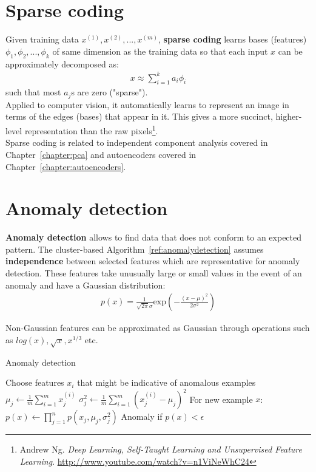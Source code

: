 \documentclass{report}
\begin{document}
\section{Sparse coding}
\label{chapter:sparsecoding}
Given training data $x^{(1)},x^{(2)},...,x^{(m)}$, {\bf sparse coding} learns bases (features) $\phi_1, \phi_2, ..., \phi_k$ of same dimension as the training data so that each input $x$ can be approximately decomposed as:
\begin{align*}
x \approx \sum_{i=1}^k a_i \phi_i
\end{align*}
such that most $a_j$s are zero ("sparse"). \\
Applied to computer vision, it automatically learns to represent an image in terms of the edges (bases) that appear in it.
This gives a more succinct, higher-level representation than the raw pixels\footnote{Andrew Ng. {\em Deep Learning, Self-Taught Learning and Unsupervised Feature Learning}. \url{http://www.youtube.com/watch?v=n1ViNeWhC24}}.
\\
Sparse coding is related to independent component analysis covered in Chapter~\ref{chapter:pca} and autoencoders covered in Chapter~\ref{chapter:autoencoders}.


\section{Anomaly detection}
{\bf Anomaly detection} allows to find data that does not conform to an expected pattern. The cluster-based Algorithm~\ref{ref:anomalydetection} assumes {\bf independence} between selected features which are representative for anomaly detection. These features take unusually large or small values in the event of an anomaly and have a Gaussian distribution:
\begin{align*}
p(x)=\frac{1}{\sqrt{2\pi}\sigma}\mbox{exp}(-\frac{(x-\mu)^2}{2\sigma^2})
\end{align*}

Non-Gaussian features can be approximated as Gaussian through operations such as $log(x), \sqrt{x}, x^{1/3}$ etc.

\begin{algorithm}
\caption{Anomaly detection}
\label{ref:anomalydetection}
\begin{algorithmic}
\State Choose features $x_i$ that might be indicative of anomalous examples
\State $\mu_j \gets \frac{1}{m}\sum_{i=1}^{m}x_j^{(i)}$ 
\State $\sigma_j^2 \gets \frac{1}{m}\sum_{i=1}^{m}(x_j^{(i)}-\mu_j)^2$
\State For new example $x$: $p(x) \gets \prod_{j=1}^np(x_j,\mu_j,\sigma_j^2)$ 
\State Anomaly if $p(x) < \epsilon$
\end{algorithmic}
\end{algorithm}
\end{document}
